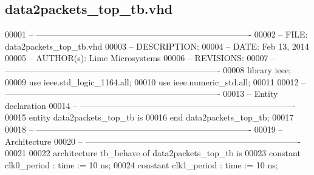 \subsection{data2packets\+\_\+top\+\_\+tb.\+vhd}
\label{data2packets__top__tb_8vhd_source}

\begin{DoxyCode}
00001 \textcolor{keyword}{-- ---------------------------------------------------------------------------- }
00002 \textcolor{keyword}{-- FILE:    data2packets\_top\_tb.vhd}
00003 \textcolor{keyword}{-- DESCRIPTION: }
00004 \textcolor{keyword}{-- DATE:    Feb 13, 2014}
00005 \textcolor{keyword}{-- AUTHOR(s):   Lime Microsystems}
00006 \textcolor{keyword}{-- REVISIONS:}
00007 \textcolor{keyword}{-- ---------------------------------------------------------------------------- }
00008 \textcolor{vhdlkeyword}{library }\textcolor{keywordflow}{ieee};
00009 \textcolor{vhdlkeyword}{use }ieee.std\_logic\_1164.\textcolor{keywordflow}{all};
00010 \textcolor{vhdlkeyword}{use }ieee.numeric\_std.\textcolor{keywordflow}{all};
00011 
00012 \textcolor{keyword}{-- ----------------------------------------------------------------------------}
00013 \textcolor{keyword}{-- Entity declaration}
00014 \textcolor{keyword}{-- ----------------------------------------------------------------------------}
00015 \textcolor{keywordflow}{entity }data2packets_top_tb \textcolor{keywordflow}{is}
00016 \textcolor{keywordflow}{end} \textcolor{vhdlchar}{data2packets\_top\_tb};
00017 
00018 \textcolor{keyword}{-- ----------------------------------------------------------------------------}
00019 \textcolor{keyword}{-- Architecture}
00020 \textcolor{keyword}{-- ----------------------------------------------------------------------------}
00021 
00022 \textcolor{keywordflow}{architecture} tb\_behave \textcolor{keywordflow}{of} data2packets_top_tb is
00023 \textcolor{keywordflow}{constant} \textcolor{vhdlchar}{clk0_period}          \textcolor{vhdlchar}{:} \textcolor{comment}{time} \textcolor{vhdlchar}{:=} \textcolor{vhdllogic}{}\textcolor{vhdllogic}{10} \textcolor{vhdlchar}{ns};
00024 \textcolor{keywordflow}{constant} \textcolor{vhdlchar}{clk1_period}          \textcolor{vhdlchar}{:} \textcolor{comment}{time} \textcolor{vhdlchar}{:=} \textcolor{vhdllogic}{}\textcolor{vhdllogic}{10} \textcolor{vhdlchar}{ns}; 

\end{DoxyCode}

